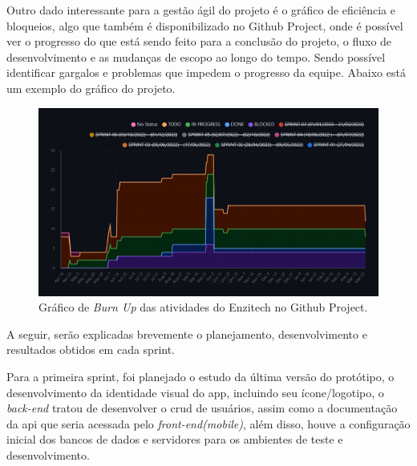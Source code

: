 Outro dado interessante para a gestão ágil do projeto é o gráfico de eficiência e bloqueios, algo que também é disponibilizado no Github Project, onde é possível ver o progresso do que está sendo feito para a conclusão do projeto, o fluxo de desenvolvimento e as mudanças de escopo ao longo do tempo. Sendo possível identificar gargalos e problemas que impedem o progresso da equipe. Abaixo está um exemplo do gráfico do projeto.

\begin{figure}[H]
\centering
  \includegraphics[width=\columnwidth]{images/grafico_projeto_github.pdf}
  \caption{Gráfico de \textit{Burn Up} das atividades do Enzitech no Github Project.}
  \label{fig:grafico_projeto_github}
\end{figure}

A seguir, serão explicadas brevemente o planejamento, desenvolvimento e resultados obtidos em cada sprint.


Para a primeira sprint, foi planejado o estudo da última versão do protótipo, o desenvolvimento da identidade visual do \ac{app}, incluindo seu ícone/logotipo, o \textit{back-end} tratou de desenvolver o \ac{crud} de usuários, assim como a documentação da \ac{api} que seria acessada pelo \textit{front-end(mobile)}, além disso, houve a configuração inicial dos bancos de dados e servidores para os ambientes de teste e desenvolvimento.

